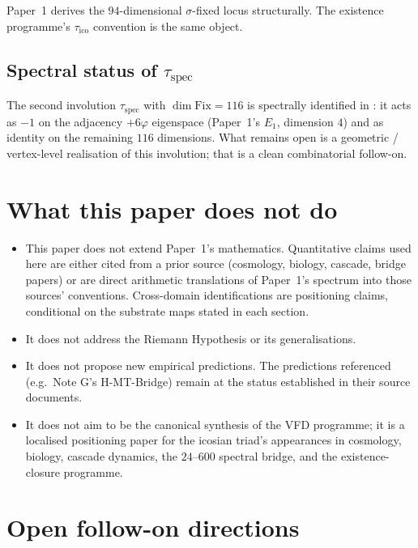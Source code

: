 \documentclass[11pt,a4paper]{article}
\theoremstyle{definition}
\theoremstyle{remark}
\begin{document}
Paper~1 derives the $94$-dimensional $\sigma$-fixed locus structurally. The
existence programme's $\tau_\mathrm{ico}$ convention is the same object.

\subsection*{Spectral status of $\tau_\mathrm{spec}$}

The second involution $\tau_\mathrm{spec}$ with
$\dim \mathrm{Fix} = 116$ is spectrally identified in
\cite{existenceClosure}: it acts as $-1$ on the adjacency $+6\varphi$
eigenspace (Paper~1's $E_1$, dimension $4$) and as identity on the
remaining $116$ dimensions. What remains open is a geometric /
vertex-level realisation of this involution; that is a clean
combinatorial follow-on.

\bigskip

\section{What this paper does not do}\label{sec:non-claims}

\begin{itemize}
  \item This paper does not extend Paper~1's mathematics. Quantitative
    claims used here are either cited from a prior source (cosmology,
    biology, cascade, bridge papers) or are direct arithmetic
    translations of Paper~1's spectrum into those sources' conventions.
    Cross-domain identifications are positioning claims, conditional on
    the substrate maps stated in each section.
  \item It does not address the Riemann Hypothesis or its generalisations.
  \item It does not propose new empirical predictions. The predictions
    referenced (e.g.\ Note G's H-MT-Bridge) remain at the status established
    in their source documents.
  \item It does not aim to be the canonical synthesis of the VFD
    programme; it is a localised positioning paper for the icosian triad's
    appearances in cosmology, biology, cascade dynamics, the
    $24$--$600$ spectral bridge, and the existence-closure programme.
\end{itemize}

\bigskip

\section{Open follow-on directions}\label{sec:open}
\end{document}
